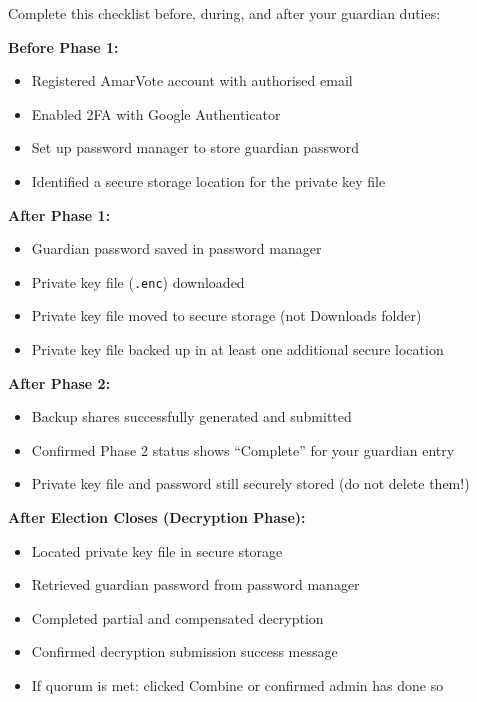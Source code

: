 \documentclass[12pt,a4paper]{book}
\begin{document}
Complete this checklist before, during, and after your guardian duties:

\vspace{0.3cm}
\textbf{Before Phase 1:}
\begin{itemize}
  \item[$\square$] Registered AmarVote account with authorised email
  \item[$\square$] Enabled 2FA with Google Authenticator
  \item[$\square$] Set up password manager to store guardian password
  \item[$\square$] Identified a secure storage location for the private key file
\end{itemize}

\vspace{0.3cm}
\textbf{After Phase 1:}
\begin{itemize}
  \item[$\square$] Guardian password saved in password manager
  \item[$\square$] Private key file (\texttt{.enc}) downloaded
  \item[$\square$] Private key file moved to secure storage (not Downloads folder)
  \item[$\square$] Private key file backed up in at least one additional secure location
\end{itemize}

\vspace{0.3cm}
\textbf{After Phase 2:}
\begin{itemize}
  \item[$\square$] Backup shares successfully generated and submitted
  \item[$\square$] Confirmed Phase 2 status shows ``Complete'' for your guardian entry
  \item[$\square$] Private key file and password still securely stored (do not delete them!)
\end{itemize}

\vspace{0.3cm}
\textbf{After Election Closes (Decryption Phase):}
\begin{itemize}
  \item[$\square$] Located private key file in secure storage
  \item[$\square$] Retrieved guardian password from password manager
  \item[$\square$] Completed partial and compensated decryption
  \item[$\square$] Confirmed decryption submission success message
  \item[$\square$] If quorum is met: clicked Combine or confirmed admin has done so
\end{itemize}
\end{document}
